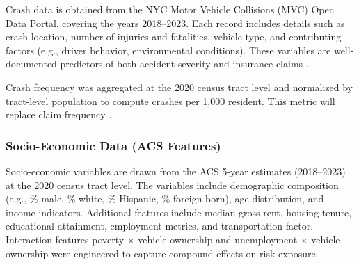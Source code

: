 \documentclass[
  number,
  review,
  3p]{elsarticle}
\begin{document}
Crash data is obtained from the NYC Motor Vehicle Collisions (MVC) Open
Data Portal, covering the years 2018--2023. Each record includes details
such as crash location, number of injuries and fatalities, vehicle type,
and contributing factors (e.g., driver behavior, environmental
conditions). These variables are well-documented predictors of both
accident severity and insurance claims \citep{adeniyi, dong}.

Crash frequency was aggregated at the 2020 census tract level and
normalized by tract-level population to compute crashes per 1,000
resident. This metric will replace claim frequency \citep{brubacher}.

\subsubsection{\texorpdfstring{\textbf{Socio-Economic Data (ACS
Features)}}{Socio-Economic Data (ACS Features)}}\label{socio-economic-data-acs-features}

Socio-economic variables are drawn from the ACS 5-year estimates
(2018--2023) at the 2020 census tract level. The variables include
demographic composition (e.g., \% male, \% white, \% Hispanic, \%
foreign-born), age distribution, and income indicators. Additional
features include median gross rent, housing tenure, educational
attainment, employment metrics, and transportation factor. Interaction
features poverty × vehicle ownership and unemployment × vehicle
ownership were engineered to capture compound effects on risk exposure.
\end{document}
